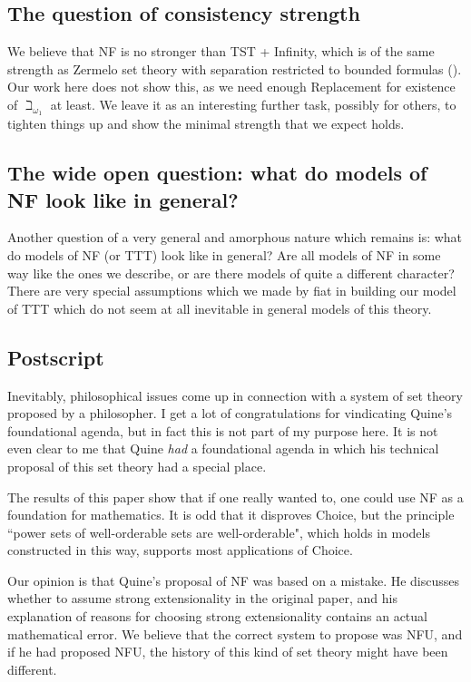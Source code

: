 \documentclass{article}
\theoremstyle{definition}
\theoremstyle{remark}
\begin{document}
\subsection{The question of consistency strength}


We believe that NF is no stronger than TST + Infinity, which is of the same strength as Zermelo set theory with separation restricted to bounded formulas (\cite{kemeny}).  Our work here does not show this, as we need enough Replacement for
existence of $\beth_{\omega_1}$ at least.  We leave it as an interesting further task, possibly for others, to tighten things up and show the minimal strength that we expect holds.

\subsection{The wide open question:  what do models of NF look like in general?}

Another question of a very general and amorphous nature which remains is:  what do models of NF (or TTT) look like in general?  Are all models of NF in some way like the ones we describe, or are there models of quite a different character?  There are very special assumptions which we made by fiat in building our model of TTT which do  not seem at all inevitable in general models of this theory.

\subsection{Postscript}

Inevitably, philosophical issues come up in connection with a system of set theory proposed by a philosopher.  I get a lot of congratulations for vindicating Quine's foundational agenda, but in fact this is not part of my purpose here.  It is not even clear to me that Quine {\em had\/} a foundational agenda in which his technical proposal of this set theory had a special place.

The results of this paper show that if one really wanted to, one could use NF as a foundation for mathematics.  It is odd that it disproves Choice, but the principle ``power sets of well-orderable sets are well-orderable", which holds in models constructed in this way, supports most applications of Choice.

Our opinion is that Quine's proposal of NF was based on a mistake.  He discusses whether to assume strong extensionality in the original paper, and his explanation of reasons for choosing strong extensionality contains an actual mathematical error.  
We believe that the correct system to propose was NFU, and if he had proposed NFU, the history of this kind of set theory might have been different.
\end{document}
